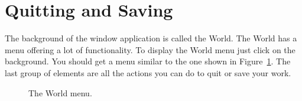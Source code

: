 




\section{Quitting and Saving}\label{sec:quit}

The background of the \sq window application is called the  World. The World has a menu offering a lot of functionality. To display the World menu just click on the background. You should get a menu similar to the one shown in Figure~\ref{fig:worldMenu}. The last group of elements are all the actions you can do to quit or save your work. 

\begin{figure}[!h]
\caption{The World menu.\label{fig:worldMenu}}
\end{figure}

